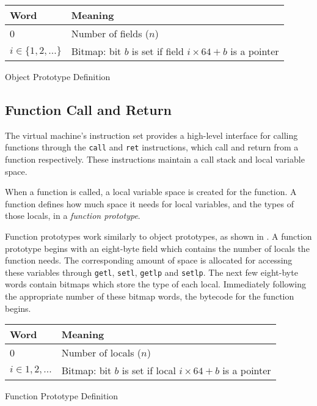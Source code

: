 		\begin{myfigure}
			\begin{tabular}{|l|l| }
				\hline
				Word & Meaning \\
				\hline
				0 & Number of fields ($n$) \\
				\hline
				$i \in \{1, 2, ...\}$ & Bitmap: bit $b$ is set if field $i\times64 + b$ is a pointer \\
				\hline
			\end{tabular}
			\caption{Object Prototype Definition}
			\label{fig:objproto}
		\end{myfigure}
		
		\subsection{Function Call and Return}
		The virtual machine's instruction set provides a high-level interface for calling functions through the \texttt{call} and \texttt{ret} instructions, which call and return from a function respectively. These instructions maintain a call stack and local variable space.
		
		When a function is called, a local variable space is created for the function. A function defines how much space it needs for local variables, and the types of those locals, in a \emph{function prototype}. 
		
		Function prototypes work similarly to object prototypes, as shown in . A function prototype begins with an eight-byte field which contains the number of locals the function needs. The corresponding amount of space is allocated for accessing these variables through \texttt{getl}, \texttt{setl}, \texttt{getlp} and \texttt{setlp}. The next few eight-byte words contain bitmaps which store the type of each local. Immediately following the appropriate number of these bitmap words, the bytecode for the function begins.
		
		\begin{myfigure}
			\begin{tabular}{|l|l| }
				\hline
				Word & Meaning \\
				\hline
				0 & Number of locals ($n$) \\
				\hline
				$i \in 1, 2, ...$ & Bitmap: bit $b$ is set if local $i\times64 + b$ is a pointer \\
				\hline
			\end{tabular}
			\caption{Function Prototype Definition}
			\label{fig:funcproto}
		\end{myfigure}
		
